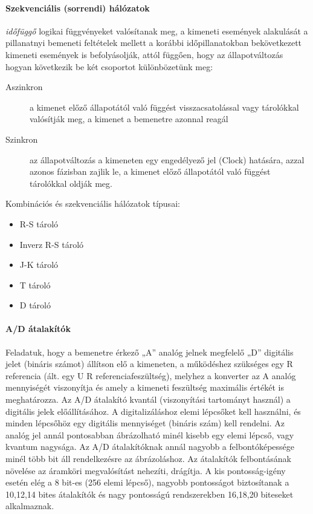 \paragraph{Szekvenciális (sorrendi) hálózatok} \emph{időfüggő} logikai függvényeket valósítanak meg, a kimeneti események alakulását a pillanatnyi bemeneti feltételek mellett a korábbi időpillanatokban bekövetkezett kimeneti események is befolyásolják, attól függően, hogy az állapotváltozás hogyan következik be két csoportot különbözetünk meg:
\begin{description}
	\item[Aszinkron] a kimenet előző állapotától való függést visszacsatolással vagy tárolókkal valósítják meg, a kimenet a bemenetre azonnal reagál
	\item[Szinkron] az állapotváltozás a kimeneten egy engedélyező jel (Clock) hatására, azzal azonos fázisban zajlik le, a kimenet előző állapotától való függést tárolókkal oldják meg.
\end{description}

Kombinációs és szekvenciális hálózatok típusai:
\begin{itemize}[nosep]
	\item R-S tároló
	\item Inverz R-S tároló
	\item J-K tároló
	\item T tároló
	\item D tároló
\end{itemize}

\paragraph{A/D átalakítók}
Feladatuk, hogy a bemenetre érkező „A” analóg jelnek megfelelő „D” digitális jelet (bináris számot) állítson elő a kimeneten, a működéshez szükséges egy R referencia (ált. egy U R referenciafeszültség), melyhez a konverter az A analóg mennyiségét viszonyítja és amely a kimeneti feszültség maximális értékét is meghatározza. Az A/D átalakító kvantál (viszonyítási tartományt használ) a digitális jelek előállításához. A digitalizáláshoz elemi lépcsőket kell használni, és minden lépcsőhöz egy digitális mennyiséget (bináris szám) kell rendelni. Az analóg jel annál pontosabban ábrázolható minél kisebb egy elemi lépcső, vagy kvantum nagysága. Az A/D átalakítóknak annál nagyobb a felbontóképessége minél több bit áll rendelkezésre az ábrázoláshoz. Az átalakítók felbontásának növelése az áramköri megvalósítást nehezíti, drágítja. A kis pontosság-igény esetén elég a 8 bit-es (256 elemi lépcső), nagyobb pontosságot biztosítanak a 10,12,14 bites átalakítók és nagy pontosságú rendszerekben 16,18,20 biteseket alkalmaznak.

